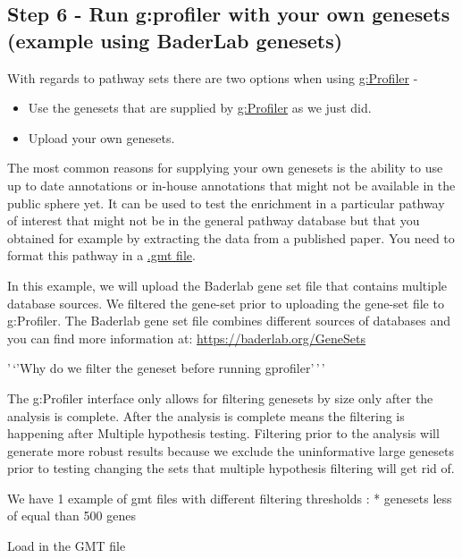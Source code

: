 \documentclass[
]{book}
\providecommand{\tightlist}{%
  \setlength{\itemsep}{0pt}\setlength{\parskip}{0pt}}
\begin{document}
\subsection{Step 6 - Run g:profiler with your own genesets (example using BaderLab genesets)}\label{step-6---run-gprofiler-with-your-own-genesets-example-using-baderlab-genesets}

With regards to pathway sets there are two options when using \href{https://biit.cs.ut.ee/gprofiler/gost}{g:Profiler} -

\begin{itemize}
\tightlist
\item
  Use the genesets that are supplied by \href{https://biit.cs.ut.ee/gprofiler/gost}{g:Profiler} as we just did.
\item
  Upload your own genesets.
\end{itemize}

The most common reasons for supplying your own genesets is the ability to use up to date annotations or in-house annotations that might not be available in the public sphere yet. It can be used to test the enrichment in a particular pathway of interest that might not be in the general pathway database but that you obtained for example by extracting the data from a published paper.
You need to format this pathway in a \href{https://www.gsea-msigdb.org/gsea/doc/GSEAUserGuideFrame.html}{.gmt file}.

In this example, we will upload the Baderlab gene set file that contains multiple database sources. We filtered the gene-set prior to uploading the gene-set file to g:Profiler.
The Baderlab gene set file combines different sources of databases and you can find more information at: \url{https://baderlab.org/GeneSets}

'\,`'Why do we filter the geneset before running gprofiler'\,'\,'

The g:Profiler interface only allows for filtering genesets by size only after the analysis is complete. After the analysis is complete means the filtering is happening after Multiple hypothesis testing. Filtering prior to the analysis will generate more robust results because we exclude the uninformative large genesets prior to testing changing the sets that multiple hypothesis filtering will get rid of.

We have 1 example of gmt files with different filtering thresholds :
* genesets less of equal than 500 genes

Load in the GMT file
\end{document}
